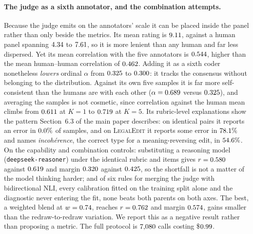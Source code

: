 \documentclass[11pt]{article}
\begin{document}
\paragraph{The judge as a sixth annotator, and the combination attempts.}
Because the judge emits on the annotators' scale it can be placed inside the
panel rather than only beside the metrics. Its mean rating is
$9.11$, against a human panel spanning $4.34$ to
$7.61$, so it is more lenient than any human and far less dispersed. Yet
its mean correlation with the five annotators is $0.544$, higher than the
mean human--human correlation of $0.462$. Adding it as a sixth coder
nonetheless \emph{lowers} ordinal $\alpha$ from $0.325$ to
$0.300$: it tracks the consensus without belonging to the
distribution. Against its own five samples it is far more self-consistent than
the humans are with each other ($\alpha=0.689$ versus $0.325$),
and averaging the samples is not cosmetic, since correlation against the human
mean climbs from $0.611$ at $K=1$ to $0.719$ at $K=5$. Its
rubric-level explanations show the pattern Section~6.3 of the main paper describes: on
identical pairs it reports an error in $0.0\%$ of samples, and on
\textsc{LegalEdit} it reports some error in $78.1\%$ and names
\emph{incohérence}, the correct type for a meaning-reversing edit, in
$54.6\%$. On the capability and combination controls: substituting a
reasoning model (\texttt{deepseek-reasoner}) under the identical rubric and
items gives $r=0.580$ against $0.619$ and margin $0.320$
against $0.425$, so the shortfall is not a matter of the model
thinking harder; and of six rules for merging the judge with bidirectional NLI,
every calibration fitted on the training split alone and the diagnostic never
entering the fit, none beats both parents on both axes. The best, a weighted
blend at $w=0.74$, reaches $r=0.762$ and margin $0.574$, gains
smaller than the redraw-to-redraw variation. We report this as a negative result
rather than proposing a metric. The full protocol is $7{,}080$ calls costing
\$$0.99$.
\end{document}
